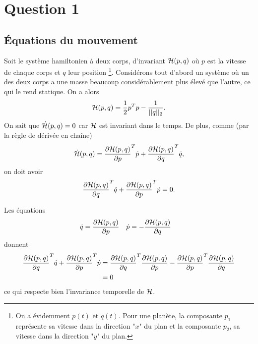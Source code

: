 \section{Question 1}
\subsection{Équations du mouvement}
Soit le système hamiltonien à deux corps, d'invariant $\mathcal{H} (p,q)$ où $p$ est la vitesse de chaque corps et $q$ leur position \footnote{On a évidemment $p(t)$ et $q(t)$. Pour une planète, la composante $p_1$ représente sa vitesse dans la direction "$x$" du plan et la composante $p_2$, sa vitesse dans la direction "$y$" du plan.}. Considérons tout d'abord un système où un des deux corps a une masse beaucoup considérablement plus élevé que l'autre, ce qui le rend statique. On a alors 
$$\mathcal{H} (p,q) = \frac{1}{2} p^T p - \frac{1}{||q||_2} . $$
On sait que $\dot{\mathcal{H}}(p,q) = 0$ car $\mathcal{H}$ est invariant dans le temps.
De plus, comme (par la règle de dérivée en chaîne)
\[
  \dot{\mathcal{H}}(p,q) = \frac{\partial \mathcal{H}(p,q)}{\partial p}^T\dot{p} + \frac{\partial \mathcal{H}(p,q)}{\partial q}^T\dot{q},
\]
on doit avoir
\[
  \frac{\partial \mathcal{H}(p,q)}{\partial q}^T\dot{q} + \frac{\partial \mathcal{H}(p,q)}{\partial p}^T\dot{p} = 0.
\]

Les équations
\begin{align*}
  \dot{q} & = \frac{\partial \mathcal{H}(p,q)}{\partial p} & \dot{p} & = -\frac{\partial \mathcal{H}(p,q)}{\partial q}
\end{align*}
donnent
\begin{align*}
  \frac{\partial \mathcal{H}(p,q)}{\partial q}^T\dot{q} + \frac{\partial \mathcal{H}(p,q)}{\partial p}^T\dot{p} & =
  \frac{\partial \mathcal{H}(p,q)}{\partial q}^T\frac{\partial \mathcal{H}(p,q)}{\partial p} - \frac{\partial \mathcal{H}(p,q)}{\partial p}^T\frac{\partial \mathcal{H}(p,q)}{\partial q}\\
  & = 0
\end{align*}
ce qui respecte bien l'invariance temporelle de $\mathcal{H}$.


